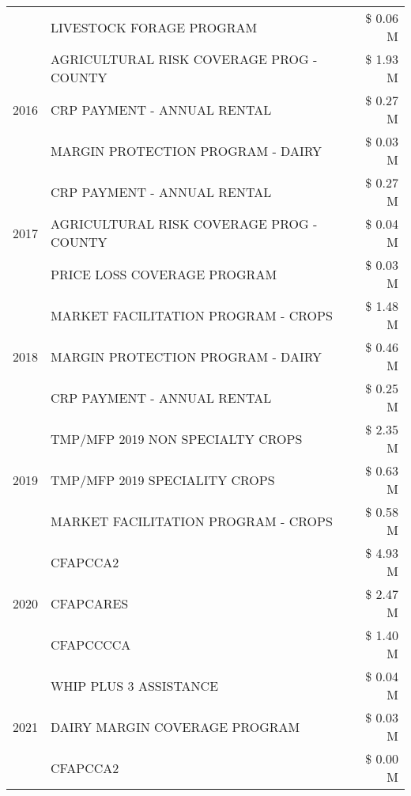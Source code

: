 \begin{tabular}{llr}
 & LIVESTOCK FORAGE PROGRAM & \$ 0.06 M \\
\cline{1-3}
\multirow[t]{3}{*}{2016} & AGRICULTURAL RISK COVERAGE PROG - COUNTY & \$ 1.93 M \\
 & CRP PAYMENT - ANNUAL RENTAL & \$ 0.27 M \\
 & MARGIN PROTECTION PROGRAM - DAIRY & \$ 0.03 M \\
\cline{1-3}
\multirow[t]{3}{*}{2017} & CRP PAYMENT - ANNUAL RENTAL & \$ 0.27 M \\
 & AGRICULTURAL RISK COVERAGE PROG - COUNTY & \$ 0.04 M \\
 & PRICE LOSS COVERAGE PROGRAM & \$ 0.03 M \\
\cline{1-3}
\multirow[t]{3}{*}{2018} & MARKET FACILITATION PROGRAM - CROPS & \$ 1.48 M \\
 & MARGIN PROTECTION PROGRAM - DAIRY & \$ 0.46 M \\
 & CRP PAYMENT - ANNUAL RENTAL & \$ 0.25 M \\
\cline{1-3}
\multirow[t]{3}{*}{2019} & TMP/MFP 2019 NON SPECIALTY CROPS & \$ 2.35 M \\
 & TMP/MFP 2019 SPECIALITY CROPS & \$ 0.63 M \\
 & MARKET FACILITATION PROGRAM - CROPS & \$ 0.58 M \\
\cline{1-3}
\multirow[t]{3}{*}{2020} & CFAPCCA2 & \$ 4.93 M \\
 & CFAPCARES & \$ 2.47 M \\
 & CFAPCCCCA & \$ 1.40 M \\
\cline{1-3}
\multirow[t]{3}{*}{2021} & WHIP PLUS 3 ASSISTANCE & \$ 0.04 M \\
 & DAIRY MARGIN COVERAGE PROGRAM & \$ 0.03 M \\
 & CFAPCCA2 & \$ 0.00 M \\
\cline{1-3}
\bottomrule
\end{tabular}
